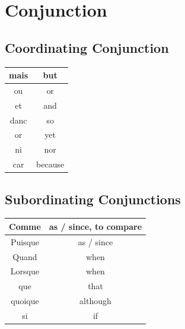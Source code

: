 \documentclass{book}
\begin{document}
\chapter{Conjunction}

    \section{Coordinating Conjunction}
        \begin{center}
            \begin{tabular}{|c|c|}
                \hline
                mais & but \\
                \hline
                ou & or \\
                \hline
                et & and \\
                \hline
                danc & so \\
                \hline
                or & yet \\
                \hline
                ni & nor \\
                \hline
                car & because \\
                \hline
            \end{tabular}
        \end{center}

    \section{Subordinating Conjunctions}
        \begin{center}
            \begin{tabular}{|c|c|}
                \hline
                Comme & as / since, to compare \\
                \hline
                Puisque & as / since \\
                \hline
                Quand & when \\
                \hline
                Lorsque & when \\
                \hline
                que & that \\
                \hline
                quoique & although \\
                \hline
                si & if \\
                \hline
            \end{tabular}
        \end{center}
\end{document}
